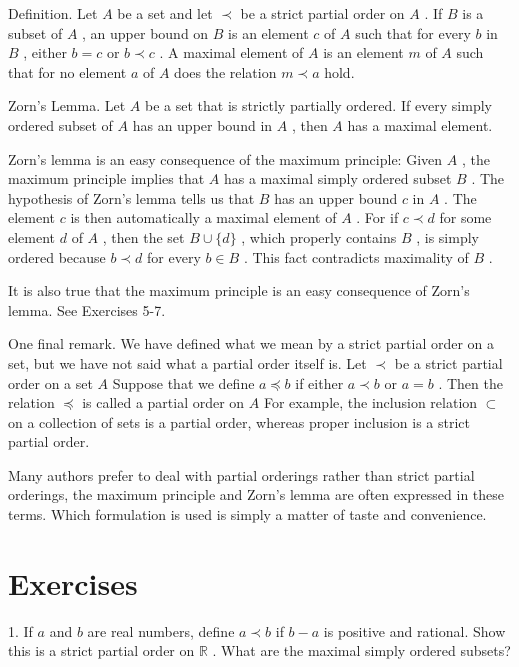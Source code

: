 Definition. Let \(A\) be a set and let \(\prec\) be a strict partial order on \(A\) . If \(B\) is a subset of \(A\) , an upper bound on \(B\) is an element \(c\) of \(A\) such that for every \(b\) in \(B\) , either \(b = c\) or \(b \prec  c\) . A maximal element of \(A\) is an element \(m\) of \(A\) such that for no element \(a\) of \(A\) does the relation \(m \prec  a\) hold.

Zorn's Lemma. Let \(A\) be a set that is strictly partially ordered. If every simply ordered subset of \(A\) has an upper bound in \(A\) , then \(A\) has a maximal element.

Zorn’s lemma is an easy consequence of the maximum principle: Given \(A\) , the maximum principle implies that \(A\) has a maximal simply ordered subset \(B\) . The hypothesis of Zorn’s lemma tells us that \(B\) has an upper bound \(c\) in \(A\) . The element \(c\) is then automatically a maximal element of \(A\) . For if \(c \prec  d\) for some element \(d\) of \(A\) , then the set \(B \cup  \{ d\}\) , which properly contains \(B\) , is simply ordered because \(b \prec  d\) for every \(b \in  B\) . This fact contradicts maximality of \(B\) .

It is also true that the maximum principle is an easy consequence of Zorn's lemma. See Exercises 5-7.

One final remark. We have defined what we mean by a strict partial order on a set, but we have not said what a partial order itself is. Let \(\prec\) be a strict partial order on a set \(A\) Suppose that we define \(a \preccurlyeq  b\) if either \(a \prec  b\) or \(a = b\) . Then the relation \(\preccurlyeq\) is called a partial order on \(A\) For example, the inclusion relation \(\subset\) on a collection of sets is a partial order, whereas proper inclusion is a strict partial order.

Many authors prefer to deal with partial orderings rather than strict partial orderings, the maximum principle and Zorn's lemma are often expressed in these terms. Which formulation is used is simply a matter of taste and convenience.

\section*{Exercises}

1. If \(a\) and \(b\) are real numbers, define \(a \prec  b\) if \(b - a\) is positive and rational. Show this is a strict partial order on \(\mathbb{R}\) . What are the maximal simply ordered subsets?

